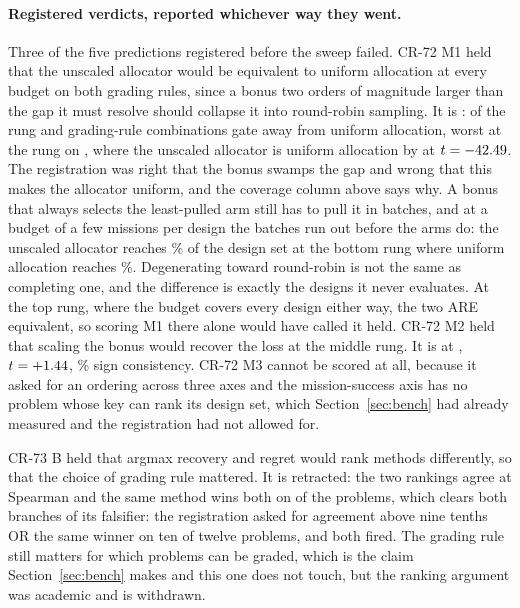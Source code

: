 \documentclass[11pt]{article}
\begin{document}
\paragraph{Registered verdicts, reported whichever way they went.} Three of the five predictions
registered before the sweep failed. CR-72 M1 held that the unscaled allocator would be equivalent
to uniform allocation at every budget on both grading rules, since a bonus two orders of magnitude
larger than the gap it must resolve should collapse it into round-robin sampling. It is
\RsMOneVerdict{}: \RsMOneGates{} of the \RsMOneOf{} rung and grading-rule combinations gate away
from uniform allocation, worst at the \RsMOneWorstRung{} rung on \RsMOneWorstField{}, where the
unscaled allocator is \RsMOneWorstDir{} uniform allocation by \RsMOneWorstMag{} at $t =
-42.49{}$. The registration was right that the bonus swamps the gap and wrong that this
makes the allocator uniform, and the coverage column above says why. A bonus that always selects
the least-pulled arm still has to pull it in batches, and at a budget of a few missions per design
the batches run out before the arms do: the unscaled allocator reaches \RsLowCoverRaw{}\% of the
design set at the bottom rung where uniform allocation reaches \RsLowCoverUni{}\%. Degenerating
toward round-robin is not the same as completing one, and the difference is exactly the designs it
never evaluates. At the top rung, where the budget covers every design either way, the two ARE
equivalent, so scoring M1 there alone would have called it held. CR-72 M2 held that scaling the bonus would recover the loss at the middle rung. It is
\RsMTwoVerdict{} at \RsMTwoEff{}, $t = +1.44{}$, \RsMTwoSign{}\% sign consistency. CR-72 M3 cannot be scored at all, because it asked for an
ordering across three axes and the mission-success axis has no problem whose key can rank its
design set, which Section~\ref{sec:bench} had already measured and the registration had not
allowed for.

CR-73 B held that argmax recovery and regret would rank methods differently, so that the choice of
grading rule mattered. It is retracted: the two rankings agree at Spearman
\RsRankSpearman{} and the same method wins both on \RsRankSame{} of the \RsRankProblems{}
problems, which clears both branches of its falsifier: the
registration asked for agreement above nine tenths OR the same winner on ten of twelve problems,
and both fired. The grading rule still matters for which problems can be graded,
which is the claim Section~\ref{sec:bench} makes and this one does not touch, but the ranking
argument was academic and is withdrawn.
\end{document}
